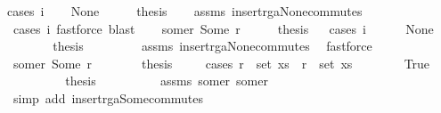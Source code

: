 \begin{isabellebody}
{\isacharparenleft}cases\ i{}{\isacharparenright}\isanewline
\ \ \isamarkupfalse%
\ None\isanewline
\ \ \isamarkupfalse%
\ \isamarkupfalse%
\ {\isacharquery}thesis\isanewline
\ \ \isamarkupfalse%
\ assms{\isacharparenleft}{}{\isacharparenright}\ insert{\isacharunderscore}rga{\isacharunderscore}None{\isacharunderscore}commutes\ \isamarkupfalse%
\ {\isacharparenleft}cases\ i{}{\isacharcomma}\ fastforce{\isacharcomma}\ blast{\isacharparenright}\isanewline
{}\isamarkupfalse%
\isanewline
\ \ \isamarkupfalse%
\ some{\isacharunderscore}r{}{\isacharcolon}\ {\isacharparenleft}Some\ r{}{\isacharparenright}\isanewline
\ \ \isamarkupfalse%
\ \isamarkupfalse%
\ {\isacharquery}thesis\isanewline
\ \ \isamarkupfalse%
{\isacharparenleft}cases\ i{}{\isacharparenright}\isanewline
\ \ \ \ \isamarkupfalse%
\ None\isanewline
\ \ \ \ \isamarkupfalse%
\ \isamarkupfalse%
\ {\isacharquery}thesis\ \isanewline
\ \ \ \ \ \ \isamarkupfalse%
\ assms{\isacharparenleft}{}{\isacharparenright}\ insert{\isacharunderscore}rga{\isacharunderscore}None{\isacharunderscore}commutes\ \isamarkupfalse%
\ fastforce\isanewline
\ \ \isamarkupfalse%
\isanewline
\ \ \ \ \isamarkupfalse%
\ some{\isacharunderscore}r{}{\isacharcolon}\ {\isacharparenleft}Some\ r{}{\isacharparenright}\isanewline
\ \ \ \ \isamarkupfalse%
\ \isamarkupfalse%
\ {\isacharquery}thesis\isanewline
\ \ \ \ \isamarkupfalse%
{\isacharparenleft}cases\ {\isachardoublequoteopen}r{}\ {\isasymin}\ set\ xs\ {\isasymand}\ r{}\ {\isasymin}\ set\ xs{\isachardoublequoteclose}{\isacharparenright}\isanewline
\ \ \ \ \ \ \isamarkupfalse%
\ True\isanewline
\ \ \ \ \ \ \isamarkupfalse%
\ \isamarkupfalse%
\ {\isacharquery}thesis\isanewline
\ \ \ \ \ \ \ \ \isamarkupfalse%
\ assms\ some{\isacharunderscore}r{}\ some{\isacharunderscore}r{}\ \isamarkupfalse%
\ {\isacharparenleft}simp\ add{\isacharcolon}\ insert{\isacharunderscore}rga{\isacharunderscore}Some{\isacharunderscore}commutes{\isacharparenright}\isanewline
\ \ \ \ \isamarkupfalse%
\isanewline
\ \ \ \ \ \ \isamarkupfalse%

\end{isabellebody}
